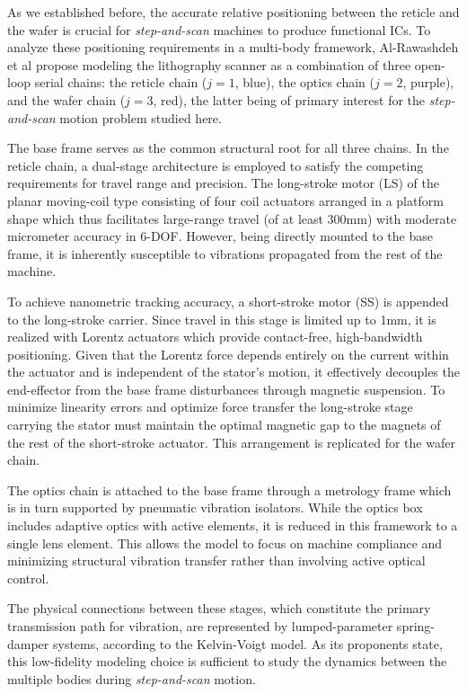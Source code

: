 As we established before, the accurate relative positioning between the reticle and the wafer is crucial for \textit{step-and-scan} machines to produce functional ICs. To analyze these positioning requirements in a multi-body framework, Al-Rawashdeh et al \cite{Al-Rawashdeh2022_Caracterization} propose modeling the lithography scanner as a combination of three open-loop serial chains: the reticle chain ($j=1$, blue), the optics chain ($j=2$, purple), and the wafer chain ($j=3$, red), the latter being of primary interest for the \textit{step-and-scan} motion problem studied here.

The base frame serves as the common structural root for all three chains. In the reticle chain, a dual-stage architecture is employed to satisfy the competing requirements for travel range and precision. The long-stroke motor (LS) of the planar moving-coil type\cite{tissingh2023improving} consisting of four coil actuators arranged in a platform shape which thus facilitates large-range travel (of at least 300mm) with moderate micrometer accuracy in 6-DOF. However, being directly mounted to the base frame, it is inherently susceptible to vibrations propagated from the rest of the machine.

To achieve nanometric tracking accuracy, a short-stroke motor (SS) is appended to the long-stroke carrier. Since travel in this stage is limited up to 1mm, it is realized with Lorentz actuators which provide contact-free, high-bandwidth positioning. Given that the Lorentz force depends entirely on the current within the actuator and is independent of the stator's motion, it effectively decouples the end-effector from the base frame disturbances through magnetic suspension\cite{Butler2011_PositionControl}. To minimize linearity errors and optimize force transfer the long-stroke stage carrying the stator must maintain the optimal magnetic gap to the magnets of the rest of the short-stroke actuator. This arrangement is replicated for the wafer chain.

The optics chain is attached to the base frame through a metrology frame which is in turn supported by pneumatic vibration isolators\cite{Butler2011_PositionControl}. While the optics box includes adaptive optics with active elements, it is reduced in this framework to a single lens element. This allows the model to focus on machine compliance and minimizing structural vibration transfer rather than involving active optical control\cite{Al-Rawashdeh2022_Caracterization}.

The physical connections between these stages, which constitute the primary transmission path for vibration, are represented by lumped-parameter spring-damper systems, according to the Kelvin-Voigt model. As its proponents state, this low-fidelity modeling choice is sufficient to study the dynamics between the multiple bodies during \textit{step-and-scan} motion\cite{Al-Rawashdeh2022_Caracterization}.

